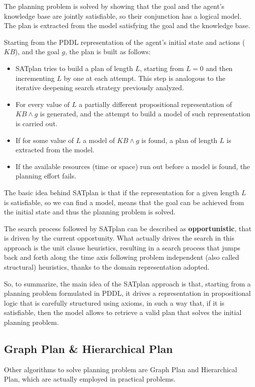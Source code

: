 \documentclass{article}
\begin{document}
\noindent
The planning problem is solved by showing that the goal and the agent's knowledge base are jointly satisfiable, so their conjunction has a logical model. The plan is extracted from the model satisfying the goal and the knowledge base.

Starting from the PDDL representation of the agent's initial state and actions ($KB$), and the goal $g$, the plan is built as follows:
\begin{itemize}
    \item SATplan tries to build a plan of length $L$, starting from $L=0$ and then incrementing $L$ by one at each attempt. This step is analogous to the iterative deepening search strategy previously analyzed.
    \item For every value of $L$ a partially different propositional representation of $KB \land g$ is generated, and the attempt to build a model of such representation is carried out.
    \item If for some value of $L$ a model of $KB \land g$ is found, a plan of length $L$ is extracted from the model.
    \item If the available resources (time or space) run out before a model is found, the planning effort fails.
\end{itemize}
The basic idea behind SATplan is that if the representation for a given length $L$ is satisfiable, so we can find a model, means that the goal can be achieved from the initial state and thus the planning problem is solved.

The search process followed by SATplan can be described as \textbf{opportunistic}, that is driven by the current opportunity. What actually drives the search in this approach is the unit clause heuristics, resulting in a search process that jumps back and forth along the time axis following problem independent (also called structural) heuristics, thanks to the domain representation adopted. 

So, to summarize, the main idea of the SATplan approach is that, starting from a planning problem formulated in PDDL, it drives a representation in propositional logic that is carefully structured using axioms, in such a way that, if it is satisfiable, then the model allows to retrieve a valid plan that solves the initial planning problem.

\subsection{Graph Plan \& Hierarchical Plan}
Other algorithms to solve planning problem are Graph Plan and Hierarchical Plan, which are actually employed in practical problems.
\end{document}
